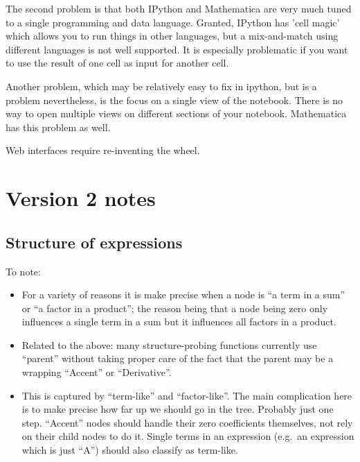 \documentclass[11pt]{article}
\begin{document}
The second problem is that both IPython and Mathematica are very much
tuned to a single programming and data language. Granted, IPython has
'cell magic' which allows you to run things in other languages, but a
mix-and-match using different languages is not well supported. It is
especially problematic if you want to use the result of one cell as
input for another cell.

Another problem, which may be relatively easy to fix in ipython, but
is a problem nevertheless, is the focus on a single view of the
notebook. There is no way to open multiple views on different sections
of your notebook. Mathematica has this problem as well.

Web interfaces require re-inventing the wheel.

% 


\section{Version 2 notes}

\subsection{Structure of expressions}

To note:
\begin{itemize}
\item For a variety of reasons it is make precise when a node is ``a
  term in a sum'' or ``a factor in a product''; the reason being that
  a node being zero only influences a single term in a sum but it
  influences all factors in a product. 

\item Related to the above: many structure-probing functions currently
  use ``parent'' without taking proper care of the fact that the
  parent may be a wrapping ``Accent'' or ``Derivative''. 

\item This is captured by ``term-like'' and ``factor-like''. The main
  complication here is to make precise how far up we should go in the
  tree. Probably just one step. ``Accent'' nodes should handle their
  zero coefficients themselves, not rely on their child nodes to do
  it. Single terms in an expression (e.g.~an expression which is just
  ``A'') should also classify as term-like.
\end{itemize}
\end{document}
